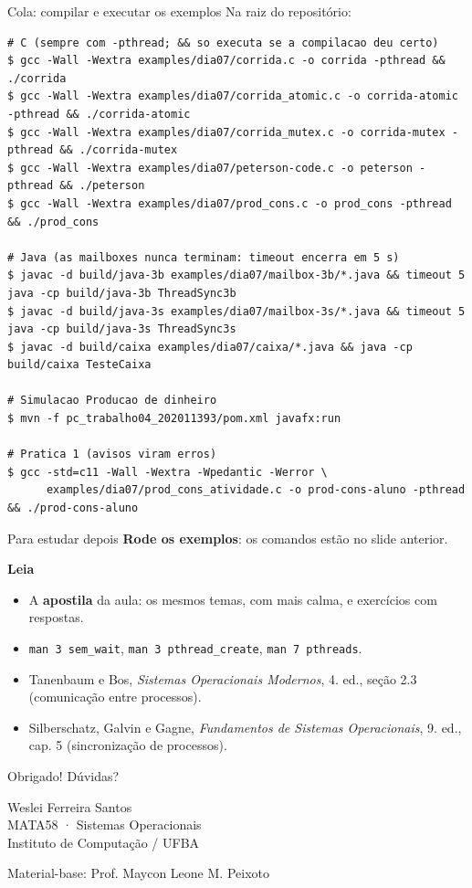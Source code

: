 \documentclass[aspectratio=169]{beamer}
\begin{document}
\begin{frame}[fragile]{Cola: compilar e executar os exemplos}
\small Na raiz do repositório:
\begin{lstlisting}[style=terminal, basicstyle=\ttfamily\tiny\color{termfg}]
# C (sempre com -pthread; && so executa se a compilacao deu certo)
$ gcc -Wall -Wextra examples/dia07/corrida.c -o corrida -pthread && ./corrida
$ gcc -Wall -Wextra examples/dia07/corrida_atomic.c -o corrida-atomic -pthread && ./corrida-atomic
$ gcc -Wall -Wextra examples/dia07/corrida_mutex.c -o corrida-mutex -pthread && ./corrida-mutex
$ gcc -Wall -Wextra examples/dia07/peterson-code.c -o peterson -pthread && ./peterson
$ gcc -Wall -Wextra examples/dia07/prod_cons.c -o prod_cons -pthread && ./prod_cons

# Java (as mailboxes nunca terminam: timeout encerra em 5 s)
$ javac -d build/java-3b examples/dia07/mailbox-3b/*.java && timeout 5 java -cp build/java-3b ThreadSync3b
$ javac -d build/java-3s examples/dia07/mailbox-3s/*.java && timeout 5 java -cp build/java-3s ThreadSync3s
$ javac -d build/caixa examples/dia07/caixa/*.java && java -cp build/caixa TesteCaixa

# Simulacao Producao de dinheiro
$ mvn -f pc_trabalho04_202011393/pom.xml javafx:run

# Pratica 1 (avisos viram erros)
$ gcc -std=c11 -Wall -Wextra -Wpedantic -Werror \
      examples/dia07/prod_cons_atividade.c -o prod-cons-aluno -pthread && ./prod-cons-aluno
\end{lstlisting}
\end{frame}

\begin{frame}{Para estudar depois}
\textbf{Rode os exemplos}: os comandos estão no slide anterior.

\vspace{0.5em}
\textbf{Leia}
\begin{itemize}
    \item A \textbf{apostila} da aula: os mesmos temas, com mais calma, e exercícios com respostas.
    \item \texttt{man 3 sem\_wait}, \texttt{man 3 pthread\_create}, \texttt{man 7 pthreads}.
    \item Tanenbaum e Bos, \emph{Sistemas Operacionais Modernos}, 4. ed., seção 2.3 (comunicação entre processos).
    \item Silberschatz, Galvin e Gagne, \emph{Fundamentos de Sistemas Operacionais}, 9. ed., cap. 5 (sincronização de processos).
\end{itemize}
\end{frame}

\begin{frame}{Obrigado!}
\centering
{\Large Dúvidas?}
\vspace{2em}

Weslei Ferreira Santos\\
MATA58 · Sistemas Operacionais\\
Instituto de Computação / UFBA

\vspace{1.5em}
{\scriptsize Material-base: Prof. Maycon Leone M. Peixoto}
\end{frame}
\end{document}
